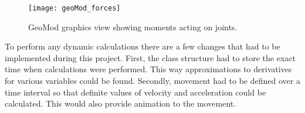 \begin{figure}[h!]
    \centering
    \texttt{[image: geoMod\_forces]}
    \caption{GeoMod graphics view showing moments acting on joints.}
    \label{geoMod_forces}
\end{figure}

To perform any dynamic calculations there are a few changes that had to be implemented during this project. First, the class structure had to store the exact time when calculations were performed. This way approximations to derivatives for various variables could be found. Secondly, movement had to be defined over a time interval so that definite values of velocity and acceleration could be calculated. This would also provide animation to the movement.

